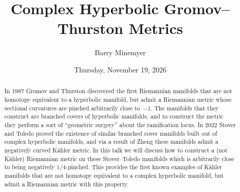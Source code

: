 \documentclass{UAmathtalk}
\author{Barry Minemyer}
\title{Complex Hyperbolic Gromov–Thurston Metrics}
\date{Thursday, November 19, 2026}
\begin{document}
\maketitle

\begin{abstract}
In 1987 Gromov and Thurston discovered the first Riemannian manifolds that are not homotopy equivalent to a hyperbolic manifold, but admit a Riemannian metric whose sectional curvatures are pinched arbitrarily close to~$-1$. The manifolds that they construct are branched covers of hyperbolic manifolds, and to construct the metric they perform a sort of “geometric surgery” about the ramification locus. In 2022 Stover and Toledo proved the existence of similar branched cover manifolds built out of complex hyperbolic manifolds, and via a result of Zheng these manifolds admit a negatively curved Kähler metric. In this talk we will discuss how to construct a (not Kähler) Riemannian metric on these Stover–Toledo manifolds which is arbitrarily close to being negatively $1/4$-pinched. This provides the first known examples of Kähler manifolds that are not homotopy equivalent to a complex hyperbolic manifold, but admit a Riemannian metric with this property.
\end{abstract}
\end{document}
